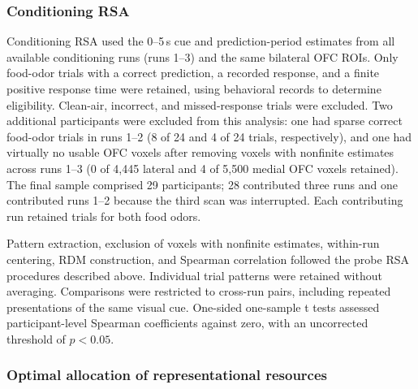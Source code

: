 \documentclass[12pt,letterpaper]{article}
\begin{document}
\subsubsection*{Conditioning RSA}

Conditioning RSA used the 0--5\,s cue and prediction-period estimates from all available conditioning runs (runs 1--3) and the same bilateral OFC ROIs. Only food-odor trials with a correct prediction, a recorded response, and a finite positive response time were retained, using behavioral records to determine eligibility. Clean-air, incorrect, and missed-response trials were excluded. Two additional participants were excluded from this analysis: one had sparse correct food-odor trials in runs 1--2 (8 of 24 and 4 of 24 trials, respectively), and one had virtually no usable OFC voxels after removing voxels with nonfinite estimates across runs 1--3 (0 of 4,445 lateral and 4 of 5,500 medial OFC voxels retained). The final sample comprised 29 participants; 28 contributed three runs and one contributed runs 1--2 because the third scan was interrupted. Each contributing run retained trials for both food odors.

Pattern extraction, exclusion of voxels with nonfinite estimates, within-run centering, RDM construction, and Spearman correlation followed the probe RSA procedures described above. Individual trial patterns were retained without averaging. Comparisons were restricted to cross-run pairs, including repeated presentations of the same visual cue. One-sided one-sample t tests assessed participant-level Spearman coefficients against zero, with an uncorrected threshold of $p < 0.05$.

\subsubsection*{Optimal allocation of representational resources}
\end{document}
